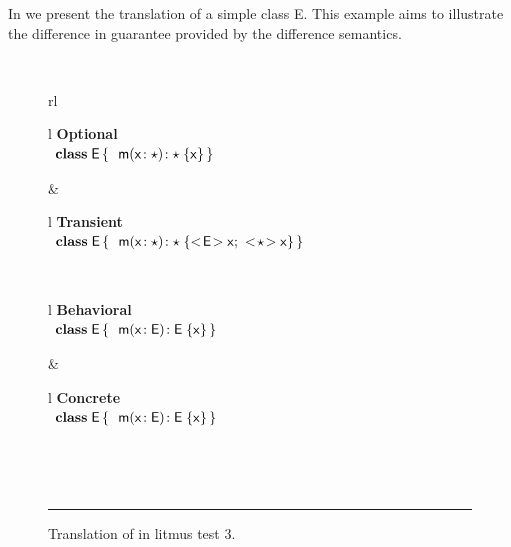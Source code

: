 \documentclass[USenglish]{tex/lipics-v2016}
\begin{document}
In  we present the translation of a simple class {\xt E}.
This example aims to illustrate the difference in guarantee provided by the
difference semantics.

\begin{figure}[!h]
\hrulefill\\
  \begin{tabular}{rl}
\\
  \begin{tabular}{l}
    {\scriptsize\bf{Optional}} \\ 
\(
\begin{array}{l@{\,}l}
\Class{\xt E}{}{&\Mdef\m\x{\any}{\any}\x } \\
\end{array}
\) 
\end{tabular}&
  \begin{tabular}{l}
    {\scriptsize\bf{Transient}} \\
\(
\begin{array}{l@{\,}l}
\Class{\xt E}{}{&\Mdef\m\x\any\any{\SubCast{\xt E}\x ; ~ \SubCast{\any}{\x}}} \\
\end{array}
\)
\end{tabular}\\
  \begin{tabular}{l}
    {\scriptsize\bf{Behavioral}} \\
\(
\begin{array}{l@{\,}l}
\Class{\xt E}{}{&\Mdef\m\x{\xt E}{\xt E}\x} \\
\end{array}
\) 
\end{tabular} &
  \begin{tabular}{l}
    {\scriptsize\bf{Concrete}} \\
\(
\begin{array}{l@{\,}l}
\Class{\xt E}{}{&\Mdef\m\x{\xt E}{\xt E}\x} \\
\end{array}
\) 
\end{tabular}\\
  \end{tabular}\vspace{2mm}\\
\hrule\vspace{4mm}
  
 \caption{Translation of  in litmus test 3.}  \label{fig:l3etrans}
\end{figure}
\end{document}
